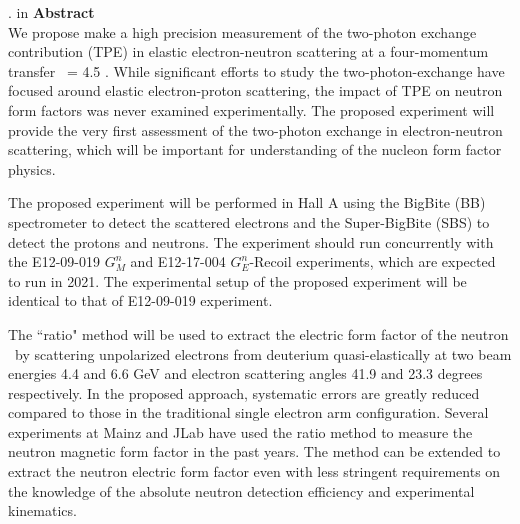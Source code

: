 {. in {\large {\bf Abstract}}} \\

We propose make a high precision measurement of the two-photon exchange contribution (TPE) in elastic electron-neutron scattering at a four-momentum transfer \qsq~= 4.5 \gevcsq. 
While significant efforts to study the two-photon-exchange have focused around elastic electron-proton scattering, the impact of TPE on neutron form factors was never examined experimentally. 
The proposed experiment will provide the very first assessment of the two-photon exchange in electron-neutron scattering, which will be important for understanding of the nucleon form factor physics. \par
The proposed experiment will be performed in Hall A using the BigBite (BB) spectrometer to detect the scattered electrons and the Super-BigBite (SBS) to detect the protons and neutrons. 
The experiment should run concurrently with the E12-09-019 $G_M^n$ and E12-17-004 $G_E^n$-Recoil experiments, which are expected to run in 2021. 
The experimental setup of the proposed experiment will be identical to that of E12-09-019 experiment. \par
The ``ratio" method will be used to extract the electric form factor of the neutron \gen~by scattering unpolarized electrons from deuterium quasi-elastically at two beam energies 4.4 and 6.6 GeV and electron scattering angles 41.9 and 23.3 degrees respectively. 
In the proposed approach, systematic errors are greatly reduced compared to those in the traditional single electron arm configuration. 
Several experiments at Mainz and JLab have used the ratio method to measure the neutron magnetic form factor in the past years. 
The method can be extended to extract the neutron electric form factor even with less stringent requirements 
on the knowledge of the absolute neutron detection efficiency and experimental kinematics.  

